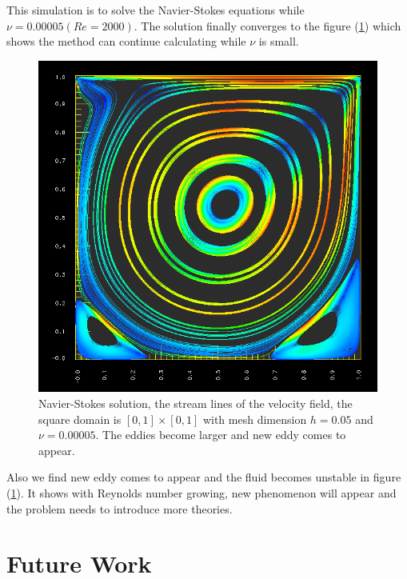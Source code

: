 \documentclass[a4paper]{article}
\begin{document}
This simulation is to solve the Navier-Stokes equations while $\nu=0.00005(Re=2000)$. The solution finally converges to the figure (\ref{im::d}) which shows the method can continue calculating while $\nu$ is small.
\begin{figure}[h]
\centering
\includegraphics[scale = 0.5]{images/e.png}
\caption{Navier-Stokes solution, the stream lines of the velocity field, the square domain is $[0, 1] \times [0, 1]$ with mesh dimension $h=0.05$ and $\nu=0.00005$. The eddies become larger and new eddy comes to appear.}
\label{im::d}
\end{figure}


Also we find new eddy comes to appear and the fluid becomes unstable in figure (\ref{im::d}). It shows with Reynolds number growing, new phenomenon will appear and the problem needs to introduce more theories.
\section{Future Work}
\end{document}
